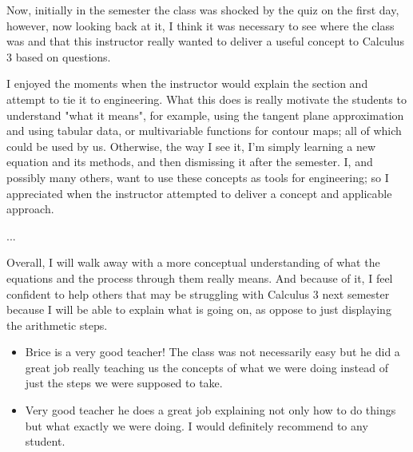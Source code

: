 \documentclass[11pt]{article}
\begin{document}
\begin{itemize}
Now, initially in the semester the class was shocked by the quiz on the first day, however, now looking back at it, I think it was necessary to see where the class was and that this instructor really wanted to deliver a useful concept to Calculus 3 based on questions.

I enjoyed the moments when the instructor would explain the section and attempt to tie it to engineering. What this does is really motivate the students to understand "what it means", for example, using the tangent plane approximation and using tabular data, or multivariable functions for contour maps; all of which could be used by us. Otherwise, the way I see it, I'm simply learning a new equation and its methods, and then dismissing it after the semester. I, and possibly many others, want to use these concepts as tools for engineering; so I appreciated when the instructor attempted to deliver a concept and applicable approach.

...

Overall, I will walk away with a more conceptual understanding of what the equations and the process through them really means. And because of it, I feel confident to help others that may be struggling with Calculus 3 next semester because I will be able to explain what is going on, as oppose to just displaying the arithmetic steps.
	\end{itemize}


	\begin{itemize}
	
		\item{} Brice is a very good teacher! The class was not necessarily easy but he did a great job really teaching us the concepts of what we were doing instead of just the steps we were supposed to take.
		
		\item{} Very good teacher he does a great job explaining not only how to do things but what exactly we were doing. I would definitely recommend to any student.
	\end{itemize}
\end{document}
